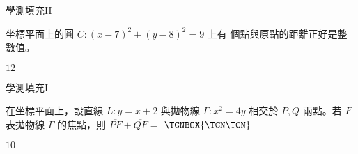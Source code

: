     \begin{QUESTION}
        \begin{ExamInfo}{93}{學測}{填充}{H}
        \end{ExamInfo}
        \begin{ExamAnsRateInfo}{21}{37}{18}{8}
        \end{ExamAnsRateInfo}
        \begin{QBODY}
            坐標平面上的圓 $C:(x-7)^2+(y-8)^2=9$ 上有 
            \TCNBOX{\TCN\TCN} 個點與原點的距離正好是整數值。
        \end{QBODY}
        \begin{QFROMS}
        \end{QFROMS}
        \begin{QTAGS}\end{QTAGS}
        \begin{QANS}
            $12$
        \end{QANS}
        \begin{QSOLLIST}
        \end{QSOLLIST}
        \begin{QEMPTYSPACE}
        \end{QEMPTYSPACE}
    \end{QUESTION}
    \begin{QUESTION}
        \begin{ExamInfo}{93}{學測}{填充}{I}
        \end{ExamInfo}
        \begin{ExamAnsRateInfo}{19}{47}{7}{3}
        \end{ExamAnsRateInfo}
        \begin{QBODY}
            在坐標平面上，設直線 $L:y=x+2$ 與拋物線 $\Gamma :x^2=4y$ 相交於 $P,Q$ 兩點。若 $F$ 表拋物線 $\Gamma$ 的焦點，則 $\overline{PF}+\overline{QF}=$ 
            $\TCNBOX{\TCN\TCN}$
        \end{QBODY}
        \begin{QFROMS}
        \end{QFROMS}
        \begin{QTAGS}\end{QTAGS}
        \begin{QANS}
            $10$
        \end{QANS}
        \begin{QSOLLIST}
        \end{QSOLLIST}
        \begin{QEMPTYSPACE}
        \end{QEMPTYSPACE}
    \end{QUESTION}

